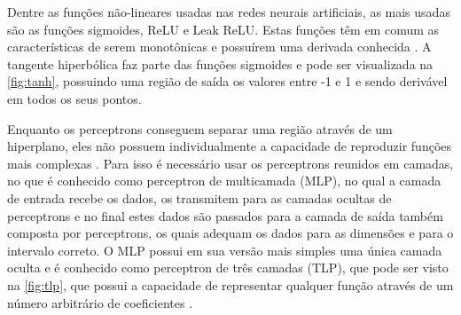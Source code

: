 Dentre as funções não-lineares usadas nas redes neurais artificiais, as mais usadas são as funções sigmoides, ReLU e Leak ReLU. Estas funções têm em comum as características de serem monotônicas e possuírem uma derivada conhecida \cite{Szandaa2020}. A tangente hiperbólica faz parte das funções sigmoides e pode ser visualizada na \autoref{fig:tanh}, possuindo uma região de saída os valores entre -1 e 1 e sendo derivável em todos os seus pontos.

Enquanto os perceptrons conseguem separar uma região através de um hiperplano, eles não possuem individualmente a capacidade de reproduzir funções mais complexas \cite{haykin1999neural}. Para isso é necessário usar os perceptrons reunidos em camadas, no que é conhecido como perceptron de multicamada (MLP), no qual a camada de entrada recebe os dados, os transmitem para as camadas ocultas de perceptrons e no final estes dados são passados para a camada de saída também composta por perceptrons, os quais adequam os dados para as dimensões e para o intervalo correto. O MLP possui em sua versão mais simples uma única camada oculta e é conhecido como perceptron de três camadas (TLP), que pode ser visto na \autoref{fig:tlp}, que possui a capacidade de representar qualquer função através de um número arbitrário de coeficientes \cite{Hornik1991}.
\ExplSyntaxOn
{}
\ExplSyntaxOff
\def\layersep{2cm}
\storedata{}

